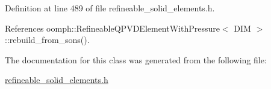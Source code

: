 Definition at line 489 of file refineable\+\_\+solid\+\_\+elements.\+h.



References oomph\+::\+Refineable\+Q\+P\+V\+D\+Element\+With\+Pressure$<$ D\+I\+M $>$\+::rebuild\+\_\+from\+\_\+sons().



The documentation for this class was generated from the following file\+:\begin{DoxyCompactItemize}
\item 
\hyperlink{refineable__solid__elements_8h}{refineable\+\_\+solid\+\_\+elements.\+h}\end{DoxyCompactItemize}

